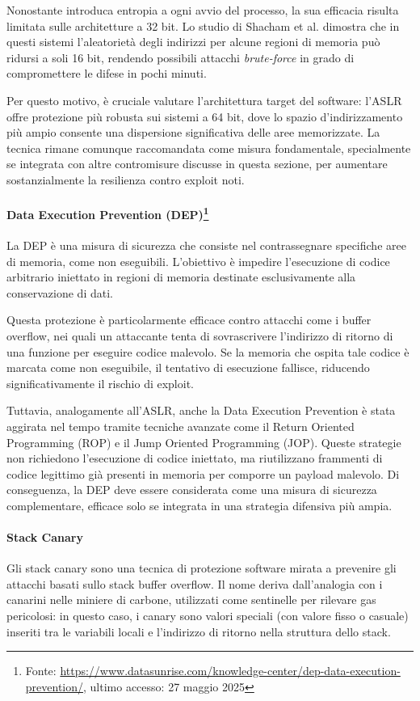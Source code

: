 Nonostante introduca entropia a ogni avvio del processo, la sua efficacia
risulta limitata sulle architetture a 32 bit. Lo studio di Shacham et al.\cite{aslr_effectiveness}
dimostra che in questi sistemi l'aleatorietà degli indirizzi per alcune regioni di
memoria può ridursi a soli 16 bit, rendendo possibili attacchi \textit{brute-force}
in grado di compromettere le difese in pochi minuti.

Per questo motivo, è cruciale valutare l'architettura target del software: l'ASLR
offre protezione più robusta sui sistemi a 64 bit, dove lo spazio d'indirizzamento
più ampio consente una dispersione significativa delle aree memorizzate. La tecnica
rimane comunque raccomandata come misura fondamentale, specialmente se integrata
con altre contromisure discusse in questa sezione, per aumentare sostanzialmente
la resilienza contro exploit noti.

\paragraph{Data Execution Prevention (DEP)\protect\footnote{Fonte: \url{https://www.datasunrise.com/knowledge-center/dep-data-execution-prevention/},
ultimo accesso: 27 maggio 2025}}
La DEP è una misura di sicurezza che consiste nel contrassegnare specifiche aree
di memoria, come non eseguibili. L'obiettivo è impedire l'esecuzione di codice
arbitrario iniettato in regioni di memoria destinate esclusivamente alla
conservazione di dati.

Questa protezione è particolarmente efficace contro attacchi come i buffer
overflow, nei quali un attaccante tenta di sovrascrivere l'indirizzo di ritorno di
una funzione per eseguire codice malevolo. Se la memoria che ospita tale codice
è marcata come non eseguibile, il tentativo di esecuzione fallisce, riducendo
significativamente il rischio di exploit.

Tuttavia, analogamente all'ASLR, anche la Data Execution Prevention è stata
aggirata nel tempo tramite tecniche avanzate come il Return Oriented Programming
(ROP) e il Jump Oriented Programming (JOP). Queste strategie non richiedono l'esecuzione
di codice iniettato, ma riutilizzano frammenti di codice legittimo già presenti
in memoria per comporre un payload malevolo. Di conseguenza, la DEP deve essere
considerata come una misura di sicurezza complementare, efficace solo se integrata
in una strategia difensiva più ampia.

\paragraph{Stack Canary}
Gli stack canary sono una tecnica di protezione software mirata a prevenire gli
attacchi basati sullo stack buffer overflow. Il nome deriva dall'analogia con i canarini
nelle miniere di carbone, utilizzati come sentinelle per rilevare gas pericolosi:
in questo caso, i canary sono valori speciali (con valore fisso o casuale)
inseriti tra le variabili locali e l'indirizzo di ritorno nella struttura dello
stack.

